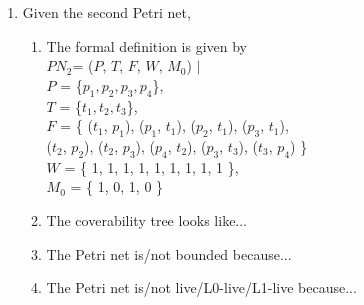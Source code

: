\documentclass{bsu-ms}
\begin{document}
\begin{enumerate}
	\item Given the second Petri net,
	\begin{enumerate}[label=(\alph*)]
		\item The formal definition is given by \\
		$PN_2$= ($P$, $T$, $F$, $W$, $M_0$) $\mid$ \\
		$P$ = \{$p_1, p_2, p_3, p_4$\}, \\
		$T$ = \{$t_1, t_2, t_3$\}, \\
		$F$ = \{ ($t_1$, $p_1$), ($p_1$, $t_1$), ($p_2$, $t_1$),
		($p_3$, $t_1$), \\ ($t_2$, $p_2$), ($t_2$, $p_3$),
		($p_4$, $t_2$), ($p_3$, $t_3$), ($t_3$, $p_4$) \} \\
		$W$ = \{ 1, 1, 1, 1, 1, 1, 1, 1, 1 \}, \\
        $M_0$ = \{ 1, 0, 1, 0 \}
		\item The coverability tree looks like...
		\item The Petri net is/not bounded because...
		\item The Petri net is/not live/L0-live/L1-live because...
	\end{enumerate}
\end{enumerate}
\end{document}
